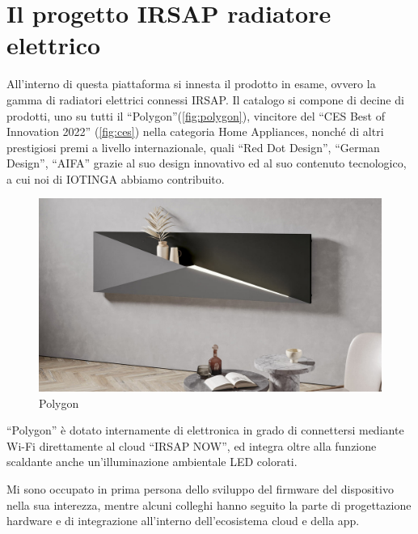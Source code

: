 \documentclass[12pt,a4paper,twoside,titlepage]{book}
\begin{document}
\section{Il progetto IRSAP radiatore elettrico}

All'interno di questa piattaforma si innesta il prodotto in esame,
ovvero la gamma di radiatori elettrici connessi IRSAP. Il catalogo si compone di
decine di prodotti, uno su tutti il ``Polygon''(\autoref{fig:polygon}), vincitore del
``CES Best of Innovation 2022'' (\autoref{fig:ces}) nella categoria Home Appliances,
nonché di altri prestigiosi premi a livello internazionale, quali ``Red Dot Design'',
``German Design'', ``AIFA'' %
grazie al suo design innovativo ed al suo contenuto tecnologico,
a cui noi di IOTINGA abbiamo contribuito.

\begin{figure}[ht]
    \centering
    \includegraphics[width=12cm]{img/polygon.jpeg}
    \caption{Polygon}
    \label{fig:fig:polygon}
\end{figure}

``Polygon'' è dotato internamente di elettronica in grado di connettersi mediante
Wi-Fi direttamente al cloud ``IRSAP NOW'', ed integra oltre alla funzione scaldante
anche un'illuminazione ambientale LED colorati.

Mi sono occupato in prima persona dello sviluppo del firmware del dispositivo nella
sua interezza, mentre alcuni colleghi hanno seguito la parte di progettazione hardware
e di integrazione all'interno dell'ecosistema cloud e della app.
\end{document}
